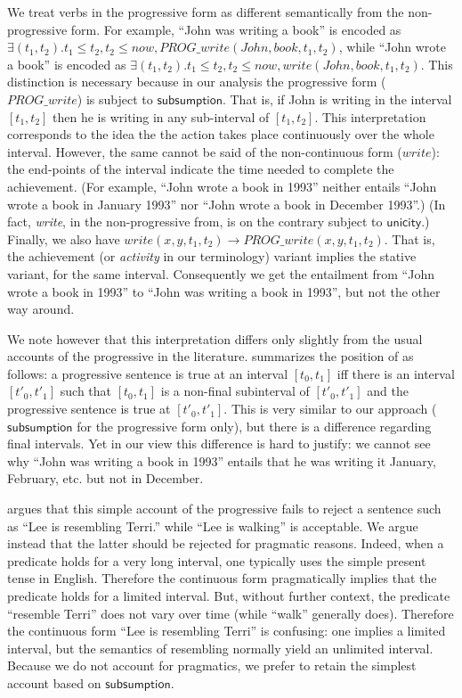 \documentclass[a4paper,twoside]{article}
\newcommand\constant[1]{\mathsf{#1}}
\begin{document}
We treat verbs in the progressive form as different semantically from
the non-progressive form. For example, ``John was writing a book'' is
encoded as
$∃(t_1, t_2). t_1≤ t_2, t_2 ≤ now, PROG\_write(John,book,t_1,t_2)$,
while ``John wrote a book'' is encoded as
$∃(t_1, t_2). t_1≤ t_2, t_2 ≤ now, write(John,book,t_1,t_2)$. This distinction is
necessary because in our analysis the progressive form ($PROG\_write$) is subject to
$\constant{subsumption}$. That is, if John is writing in the interval
$[t_1,t_2]$ then he is writing in any sub-interval of
$[t_1,t_2]$. This interpretation corresponds to the idea the the action takes place continuously over the whole interval.
However, the same cannot be said of the non-continuous form ($write$): the
end-points of the interval indicate the time needed to complete the
achievement. (For example, ``John wrote a book in 1993'' neither
entails ``John wrote a book in January 1993'' nor ``John wrote a book
in December 1993''.) (In fact, \emph{write}, in the non-progressive
from, is on the contrary subject to $\constant{unicity}$.) Finally, we
also have $write(x,y,t_1,t_2) → PROG\_write(x,y,t_1,t_2)$. That is,
the achievement (or \emph{activity} in our terminology) variant implies the stative variant, for the
same interval.  Consequently we get the entailment from ``John wrote a
book in 1993'' to ``John was writing a book in 1993'', but not the other way around.

We note however that this interpretation differs only slightly from
the usual accounts of the progressive in the
literature.  summarizes the position of
\citet{bennett1978toward} as follows: a progressive sentence is true
at an interval $[t_0,t_1]$ iff there is an interval $[t'_0,t'_1]$ such
that $[t_0,t_1]$ is a non-final subinterval of $[t'_0,t'_1]$ and the
progressive sentence is true at $[t'_0,t'_1]$. This is very similar to
our approach ($\constant{subsumption}$ for the progressive form only),
but there is a difference regarding final intervals. Yet in our view
this difference is hard to justify: we cannot see why ``John was
writing a book in 1993'' entails that he was writing it January,
February, etc. but not in December.

 argues that this simple account of the
progressive fails to reject a sentence such as ``Lee is resembling
Terri.'' while ``Lee is walking'' is acceptable. We argue instead that
the latter should be rejected for pragmatic reasons. Indeed, when a
predicate holds for a very long interval, one typically uses the
simple present tense in English. Therefore the continuous form
pragmatically implies that the predicate holds for a limited interval.
But, without further context, the predicate ``resemble Terri'' does
not vary over time (while ``walk'' generally does). Therefore the
continuous form ``Lee is resembling Terri'' is confusing: one implies
a limited interval, but the semantics of resembling normally yield an unlimited interval.
%
Because we do not account for pragmatics, we prefer to retain the
simplest account based on $\constant{subsumption}$.
\end{document}
